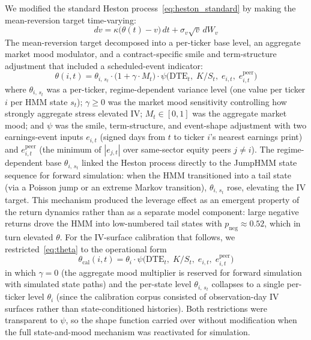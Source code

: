 We modified the standard Heston process~\eqref{eq:heston_standard} by making the mean-reversion target time-varying:
\begin{equation}\label{eq:heston_modified}
    dv = \kappa\bigl(\theta(t) - v\bigr)\,dt + \sigma_v \sqrt{v}\,dW_v
\end{equation}
The mean-reversion target decomposed into a per-ticker base level, an aggregate market mood modulator, and a contract-specific smile and term-structure adjustment that included a scheduled-event indicator:
\begin{equation}\label{eq:theta}
    \theta(i, t) = \theta_{i,\,s_t} \cdot \bigl(1 + \gamma \cdot M_t\bigr) \cdot \psi\bigl(\mathrm{DTE}_t,\; K/S_t,\; e_{i,t},\; e^{\text{peer}}_{i,t}\bigr)
\end{equation}
where $\theta_{i,\,s_t}$ was a per-ticker, regime-dependent variance level (one value per ticker $i$ per HMM state $s_t$); $\gamma \geq 0$ was the market mood sensitivity controlling how strongly aggregate stress elevated IV; $M_t \in [0, 1]$ was the aggregate market mood; and $\psi$ was the smile, term-structure, and event-shape adjustment with two earnings-event inputs $e_{i,t}$ (signed days from $t$ to ticker $i$'s nearest earnings print) and $e^{\text{peer}}_{i,t}$ (the minimum of $|e_{j,t}|$ over same-sector equity peers $j \neq i$). The regime-dependent base $\theta_{i,\,s_t}$ linked the Heston process directly to the JumpHMM state sequence for forward simulation: when the HMM transitioned into a tail state (via a Poisson jump or an extreme Markov transition), $\theta_{i,\,s_t}$ rose, elevating the IV target. This mechanism produced the leverage effect as an emergent property of the return dynamics rather than as a separate model component: large negative returns drove the HMM into low-numbered tail states with $p_{\text{neg}} \approx 0.52$, which in turn elevated $\theta$. For the IV-surface calibration that follows, we restricted~\eqref{eq:theta} to the operational form
\begin{equation}\label{eq:theta_calibration}
    \theta_{\text{cal}}(i, t) = \theta_i \cdot \psi\bigl(\mathrm{DTE}_t,\; K/S_t,\; e_{i,t},\; e^{\text{peer}}_{i,t}\bigr)
\end{equation}
in which $\gamma = 0$ (the aggregate mood multiplier is reserved for forward simulation with simulated state paths) and the per-state level $\theta_{i,\,s_t}$ collapses to a single per-ticker level $\theta_i$ (since the calibration corpus consisted of observation-day IV surfaces rather than state-conditioned histories). Both restrictions were transparent to $\psi$, so the shape function carried over without modification when the full state-and-mood mechanism was reactivated for simulation.


